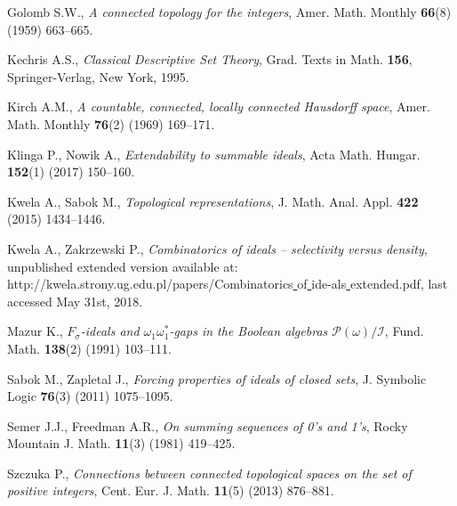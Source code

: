\documentclass{amsart}
\theoremstyle{definition}
\theoremstyle{definition}
\begin{document}
\begin{thebibliography}{abc}
Golomb S.W., \emph{A connected topology for the integers},
Amer. Math. Monthly {\bf 66}(8) (1959) 663--665.

Kechris A.S., \emph{Classical Descriptive Set Theory},
Grad. Texts in Math. {\bf 156}, Springer-Verlag, New York, 1995.

Kirch A.M., \emph{A countable, connected, locally connected Hausdorff space},
Amer. Math. Monthly {\bf 76}(2) (1969) 169--171.


Klinga P., Nowik A., \emph{Extendability to summable ideals},
Acta Math. Hungar. {\bf 152}(1) (2017) 150--160.

Kwela A., Sabok M., \emph{Topological representations},
J. Math. Anal. Appl. {\bf 422} (2015) 1434--1446.

Kwela A., Zakrzewski P., \emph{Combinatorics of ideals -- selectivity versus density}, unpublished extended version available at:
http://kwela.strony.ug.edu.pl/papers/Combinatorics\underline{ }of\underline{ }ide-als\underline{ }extended.pdf,
last accessed May 31st, 2018.

Mazur K., \emph{$F_\sigma$-ideals and $\omega_1\omega_1^*$-gaps in the Boolean algebras $\mathcal{P}(\omega)/\mathcal{I}$},
Fund. Math. {\bf 138}(2) (1991) 103--111.




Sabok M., Zapletal J., \emph{Forcing properties of ideals of closed sets}, 
J. Symbolic Logic {\bf 76}(3) (2011) 1075--1095.

Semer J.J., Freedman A.R., \emph{On summing sequences of 0’s and 1’s},
Rocky Mountain J. Math. {\bf 11}(3) (1981) 419--425.

Szczuka P., \emph{Connections between connected topological spaces on the set of positive integers}, 
Cent. Eur. J. Math. {\bf 11}(5) (2013) 876--881.


\end{thebibliography}
\end{document}
